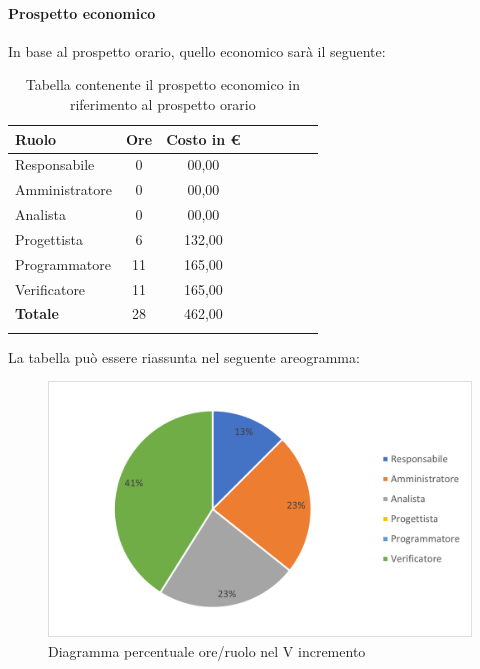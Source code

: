 \paragraph{Prospetto economico}
In base al prospetto orario, quello economico sarà il seguente:

\begin{longtable}{|l|c|c|c|c|c|c|c|}
	\hline
	\rowcolor{lighter-grayer}
	\textbf{Ruolo}  & \textbf{Ore} & \textbf{Costo in €} \\
	\hline
	\endfirsthead

	\hline
	Responsabile    & 0            & 00,00              \\
	\hline
	\hline
	Amministratore  & 0           & 00,00              \\
	\hline
	\hline
	Analista        & 0           & 00,00              \\
	\hline
	\hline
	Progettista     & 6            & 132,00                   \\
	\hline
	\hline
	Programmatore   & 11            & 165,00                   \\
	\hline
	\hline
	Verificatore    & 11           & 165,00              \\
	\hline
	\hline
	\textbf{Totale} & 28           & 462,00            \\
	\hline
	\rowcolor{white}
	\caption{Tabella contenente il prospetto economico in riferimento al prospetto orario}
\end{longtable}
\pagebreak

La tabella può essere riassunta nel seguente areogramma:
\begin{figure}[H]
	\centering
	\includegraphics[width=0.8\linewidth]{res/images/preventivo/dettaglio_analisi/2-2.png}
	\caption{Diagramma percentuale ore/ruolo nel V incremento}
	\label{fig:diagramma costi ruolo V incremento}
\end{figure}

